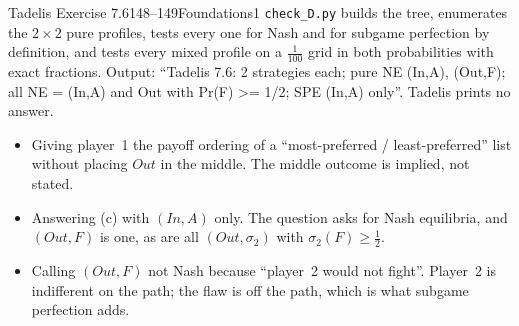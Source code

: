 \begin{exsol}{Tadelis Exercise 7.6}{148--149}{Foundations}{1}
\verify \texttt{check\_D.py} builds the tree, enumerates the $2\times2$ pure profiles, tests
every one for Nash and for subgame perfection by definition, and tests every mixed profile
on a $\frac1{100}$ grid in both probabilities with exact fractions. Output:
``Tadelis 7.6: 2 strategies each; pure NE (In,A), (Out,F); all NE = (In,A) and Out with
Pr(F) >= 1/2; SPE (In,A) only''. Tadelis prints no answer.

\mistakes
\begin{itemize}
  \item Giving player~1 the payoff ordering of a ``most-preferred / least-preferred'' list without
  placing $\mathit{Out}$ in the middle. The middle outcome is implied, not stated.
  \item Answering (c) with $(\mathit{In},A)$ only. The question asks for Nash equilibria, and
  $(\mathit{Out},F)$ is one, as are all $(\mathit{Out},\sigma_2)$ with $\sigma_2(F)\ge\frac12$.
  \item Calling $(\mathit{Out},F)$ not Nash because ``player~2 would not fight''. Player~2 is
  indifferent on the path; the flaw is off the path, which is what subgame perfection adds.
\end{itemize}

\end{exsol}

